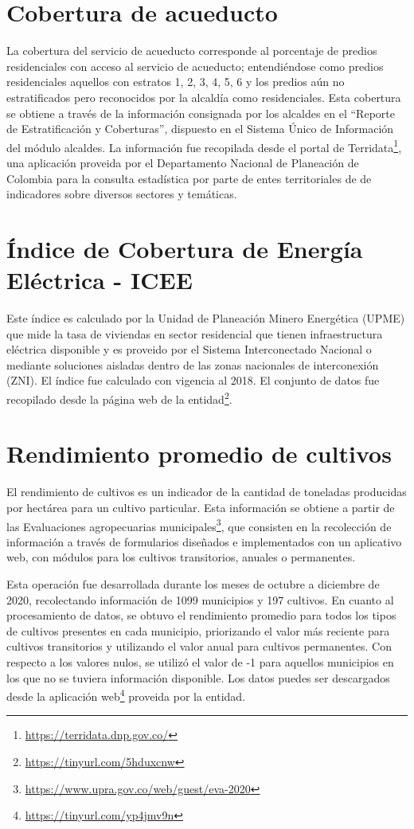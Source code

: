 \section{Cobertura de acueducto}
La cobertura del servicio de acueducto corresponde al porcentaje de predios residenciales con acceso al servicio de acueducto; entendiéndose como predios 
residenciales aquellos con estratos 1, 2, 3, 4, 5, 6 y los predios aún no estratificados pero reconocidos por la alcaldía como residenciales. Esta cobertura se 
obtiene a través de la información consignada por los alcaldes en el ``Reporte de Estratificación y Coberturas'', dispuesto en el Sistema Único de Información 
del módulo alcaldes.  La información fue recopilada desde el portal de Terridata\footnote{\url{https://terridata.dnp.gov.co/}}, una 
aplicación proveida por el Departamento Nacional de Planeación de Colombia para la consulta estadística por parte de entes territoriales de de indicadores sobre 
diversos sectores y temáticas.

\section{Índice de Cobertura de Energía Eléctrica - ICEE}

Este índice es calculado por la Unidad de Planeación Minero Energética (UPME) que mide la tasa de viviendas en sector residencial que tienen infraestructura 
eléctrica disponible y es proveido por el Sistema Interconectado Nacional o mediante soluciones aisladas dentro de las zonas nacionales de interconexión (ZNI). 
 El índice fue calculado con vigencia al 2018.  El conjunto de datos fue recopilado desde la página web de la 
entidad\footnote{\url{https://tinyurl.com/5hduxcnw}}.

\section{Rendimiento promedio de cultivos}

El rendimiento de cultivos es un indicador de la cantidad de toneladas producidas por hectárea para un cultivo particular. Esta información se obtiene a partir 
de las Evaluaciones agropecuarias municipales\footnote{\url{https://www.upra.gov.co/web/guest/eva-2020}}, que consisten en la recolección de información a 
través de formularios diseñados e implementados con un aplicativo web, con módulos para los cultivos transitorios, anuales o permanentes. 

Esta operación fue desarrollada durante los meses de octubre a diciembre de 2020, recolectando información de 1099 municipios y 197 cultivos. En cuanto al 
procesamiento de datos, se obtuvo el rendimiento promedio para todos los tipos de cultivos presentes en cada municipio, priorizando el valor más reciente para 
cultivos transitorios y utilizando el valor anual para cultivos permanentes. Con respecto a los valores nulos, se utilizó el valor de -1 para aquellos 
municipios en los que no se tuviera información disponible.  Los datos puedes ser descargados desde la aplicación 
web\footnote{\url{https://tinyurl.com/yp4jmv9n}} proveida por la entidad.
 
